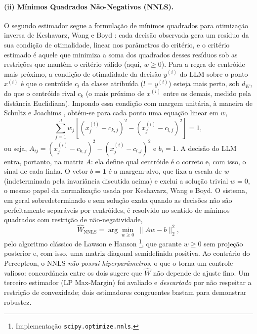 \documentclass[12pt,a4paper]{article}
\newcommand{\West}{\ensuremath{\hat{W}}}   %
\begin{document}
\paragraph{(ii) Mínimos Quadrados Não-Negativos (NNLS).}
O segundo estimador segue a formulação de mínimos quadrados para otimização inversa de
Keshavarz, Wang e Boyd \cite{keshavarzImputingConvex2011}: cada decisão observada gera um
resíduo da sua condição de otimalidade, linear nos parâmetros do critério, e o critério
estimado é aquele que minimiza a soma dos quadrados desses resíduos sob as restrições que
mantêm o critério válido (aqui, $w \geq 0$). Para a regra de centróide mais próximo, a
condição de otimalidade da decisão $y^{(i)}$ do LLM sobre o ponto $x^{(i)}$ é que o
centróide $c_l$ da classe atribuída ($l = y^{(i)}$) esteja mais perto, sob $d_W$, do que o
centróide rival $c_k$ (o mais próximo de $x^{(i)}$ entre os demais, medido pela distância
Euclidiana). Impondo essa condição com margem unitária, à maneira de Schultz e Joachims
\cite{schultzLearningDistance2003}, obtém-se para cada ponto uma equação linear em $w$,
\begin{equation}
  \sum_{j=1}^{d} w_j \left[(x^{(i)}_j - c_{k,j})^2 - (x^{(i)}_j - c_{l,j})^2\right] = 1,
  \label{eq:nnls_margem}
\end{equation}
ou seja, $A_{ij} = (x^{(i)}_j - c_{k,j})^2 - (x^{(i)}_j - c_{l,j})^2$ e $b_i = 1$. A
decisão do LLM entra, portanto, na matriz $A$: ela define qual centróide é o correto e, com
isso, o sinal de cada linha. O vetor $b = \mathbf{1}$ é a margem-alvo, que fixa a escala de
$w$ (indeterminada pela invariância discutida acima) e exclui a solução trivial $w = 0$, o
mesmo papel da normalização usada por Keshavarz, Wang e Boyd. O sistema, em geral
sobredeterminado e sem solução exata quando as decisões não são perfeitamente separáveis
por centróides, é resolvido no sentido de mínimos quadrados com restrição de
não-negatividade,
\begin{equation}
  \West_{\text{NNLS}} = \arg\min_{w \geq 0} \; \lVert A w - b \rVert_2^2,
  \label{eq:nnls}
\end{equation}
pelo algoritmo clássico de Lawson e Hanson
\cite{lawsonSolvingLeastSquares1974}\footnote{Implementação
\texttt{scipy.optimize.nnls}.}, que garante $w \geq 0$ sem projeção posterior e, com
isso, uma matriz diagonal semidefinida positiva. Ao contrário do
Perceptron, o NNLS \emph{não possui hiperparâmetros}, o que o torna um controle valioso:
concordância entre os dois sugere que \West{} não depende de ajuste fino. Um terceiro
estimador (LP Max-Margin) foi avaliado e \emph{descartado} por não respeitar a restrição
de convexidade; dois estimadores congruentes bastam para demonstrar robustez.
\end{document}
